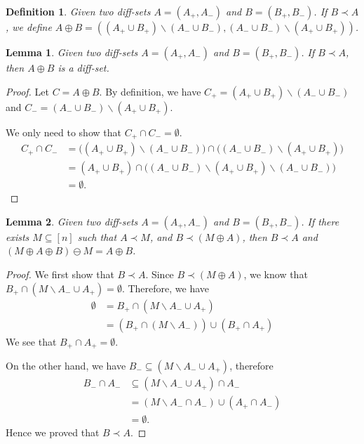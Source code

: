 \documentclass{article}
\newtheorem{define}{Definition}
\newtheorem{lemma}{Lemma}
\newcommand{\diffvalid}{\prec}
\newcommand{\del}{\backslash}
\begin{document}
\begin{spacing}{1.1}
\begin{define}
Given two diff-sets $A=(A_+,A_-)$ and $B=(B_+,B_-)$. 
If $B\diffvalid A$, we define $A\oplus B = ( (A_+\cup B_+)\del(A_-\cup B_-), (A_-\cup B_-)\del(A_+\cup B_+))$.
\end{define}

\begin{lemma}
Given two diff-sets $A=(A_+,A_-)$ and $B=(B_+,B_-)$. 
If $B\diffvalid A$, then 
$A\oplus B$ is a diff-set.
\end{lemma}

\begin{proof}
Let $C=A\oplus B$.
By definition, we have $C_+ = (A_+\cup B_+)\del(A_-\cup B_-)$ and $C_-=(A_-\cup B_-)\del(A_+\cup B_+)$.

We only need to show that $C_+\cap C_-=\emptyset$.
\begin{align*}
	C_+ \cap C_- &= \big((A_+\cup B_+)\del(A_-\cup B_-)\big)\cap\big((A_-\cup B_-)\del(A_+\cup B_+)\big)\\
			     &= (A_+\cup B_+)\cap\big((A_-\cup B_-)\del(A_+\cup B_+) \del (A_-\cup B_-)\big) \\
			     &= \emptyset.
\end{align*}
\end{proof}

\begin{lemma}
\label{lemma:diff-set-algebra}
Given two diff-sets $A=(A_+,A_-)$ and $B=(B_+,B_-)$. 
If there exists $M\subseteq [n]$ such that $A \diffvalid M$, and $B \diffvalid (M\oplus A)$,
then $B \diffvalid A$ and $(M\oplus A \oplus B)\ominus M = A\oplus B$.
\end{lemma}

\begin{proof}
We first show that $B\diffvalid A$.
Since $B \diffvalid (M\oplus A)$, we know that 
$B_+\cap (M\del A_- \cup A_+) = \emptyset$.
Therefore, we have
\begin{align*}
	\emptyset &= B_+\cap (M\del A_-\cup A_+) \\
			  &= (B_+\cap (M\del A_-))\cup (B_+\cap A_+)
\end{align*}
We see that $B_+\cap A_+=\emptyset$.

On the other hand, we have $B_-\subseteq (M\del A_-\cup A_+)$, therefore 
\begin{align*}
	B_-\cap A_- &\subseteq (M\del A_-\cup A_+)\cap A_- \\
				&= (M\del A_- \cap A_-)\cup (A_+\cap A_-) \\
				&= \emptyset.
\end{align*}
Hence we proved that $B\diffvalid A$.


\end{proof}
\end{spacing}
\end{document}
